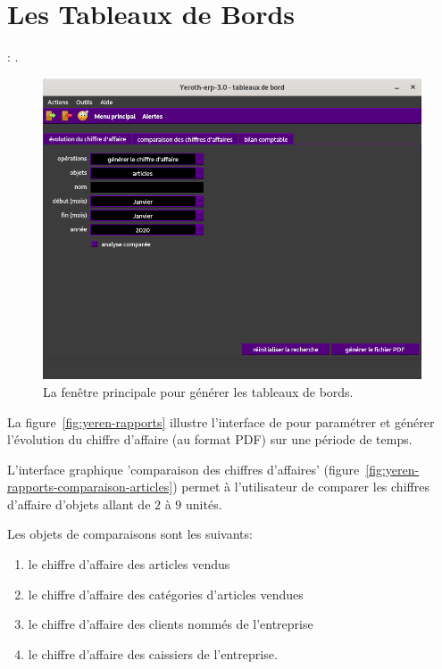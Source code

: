 \chapter{Les Tableaux de Bords}\label{chap:tableaux-de-bords}

\utilisateurs: \lienmanager.\\


\label{sec:tableaux-introduction}

\begin{figure}[!htbp]
	\centering
	\includegraphics[scale=0.45]{images/yeren-rapports.png}
	\caption{La fen\^etre principale pour g\'en\'erer les tableaux de bords.}
	\label{fig:yeroth-tableaux}
\end{figure}

La figure~\ref{fig:yeren-rapports} illustre l'interface
de \yeroth pour param\'etrer et g\'en\'erer l'\'evolution
du chiffre d'affaire (au format PDF) sur une p\'eriode de temps.

L'interface graphique 'comparaison des chiffres d'affaires'
(figure~\ref{fig:yeren-rapports-comparaison-articles})
permet \`a l'utilisateur de comparer les chiffres
d'affaire d'objets allant de $2$ \`a $9$ unit\'es.

Les objets de comparaisons sont les suivants:
\begin{enumerate}[1)]
	\item le chiffre d'affaire des articles vendus
	\item le chiffre d'affaire des cat\'egories d'articles vendues
	\item le chiffre d'affaire des clients nomm\'es de l'entreprise
	\item le chiffre d'affaire des caissiers de l'entreprise.\\
\end{enumerate}


